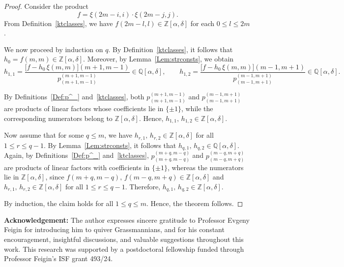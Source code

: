 \documentclass[10pt, a4paper, reqno]{amsart}
\begin{document}
\begin{proof}
	Consider the product 
	\[	f = \xi(2m-i,i) \cdot \xi(2m-j,j).	\]
	From Definition~\ref{ktclasses}, we have \( f(2m-l,l) \in \mathbb{Z}[\alpha,\delta] \) for each \( 0 \le l \le 2m \).
	
	We now proceed by induction on \( q \).  
	By Definition~\ref{ktclasses}, it follows that \( h_0 = f(m,m) \in \mathbb{Z}[\alpha,\delta] \).  
	Moreover, by Lemma~\ref{Lem:strconsts}, we obtain
	\[
	h_{1,1} = 
	\frac{\big[f - h_0 \, \xi(m,m)\big](m+1,m-1)}
	{p^{(m+1,m-1)}_{(m+1,m-1)}} \in \mathbb{Q}[\alpha,\delta],
	\qquad
	h_{1,2} = 
	\frac{\big[f - h_0 \, \xi(m,m)\big](m-1,m+1)}
	{p^{(m-1,m+1)}_{(m-1,m+1)}} \in \mathbb{Q}[\alpha,\delta].
	\]
	
	By Definitions~\ref{Def:p^_} and~\ref{ktclasses}, both 
	\( p^{(m+1,m-1)}_{(m+1,m-1)} \) and \( p^{(m-1,m+1)}_{(m-1,m+1)} \) 
	are products of linear factors whose coefficients lie in \( \{\pm 1\} \),
	while the corresponding numerators belong to \( \mathbb{Z}[\alpha,\delta] \).  
	Hence, \( h_{1,1},\, h_{1,2} \in \mathbb{Z}[\alpha,\delta] \).
	
	Now assume that for some \( q \le m \), we have 
	\( h_{r,1},\, h_{r,2} \in \mathbb{Z}[\alpha,\delta] \) for all \( 1 \le r \le q-1 \).
	By Lemma~\ref{Lem:strconsts}, it follows that
	\( h_{q,1},\, h_{q,2} \in \mathbb{Q}[\alpha,\delta] \).
	Again, by Definitions~\ref{Def:p^_} and~\ref{ktclasses}, 
	\( p^{(m+q,m-q)}_{(m+q,m-q)} \) and 
	\( p^{(m-q,m+q)}_{(m-q,m+q)} \)
	are products of linear factors with coefficients in \( \{\pm 1\} \),
	whereas the numerators lie in \( \mathbb{Z}[\alpha,\delta] \), since
	\( f(m+q,m-q),\, f(m-q,m+q) \in \mathbb{Z}[\alpha,\delta] \)
	and \( h_{r,1},\, h_{r,2} \in \mathbb{Z}[\alpha,\delta] \) for all \( 1 \le r \le q-1 \).
	Therefore, \( h_{q,1},\, h_{q,2} \in \mathbb{Z}[\alpha,\delta] \).
	
	By induction, the claim holds for all \( 1 \le q \le m \).
	Hence, the theorem follows.
\end{proof}

{\bf Acknowledgement:} 
The author expresses sincere gratitude to Professor Evgeny Feigin for introducing him to quiver Grassmannians, and for his constant encouragement,  insightful discussions, and valuable suggestions throughout this work. This research was supported by a postdoctoral fellowship funded through Professor Feigin’s ISF grant 493/24.

\end{document}
